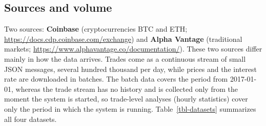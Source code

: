 \documentclass[
]{article}
\begin{document}
\subsection{Sources and volume}\label{sources-and-volume}

Two sources: \textbf{Coinbase} (cryptocurrencies BTC and ETH; \url{https://docs.cdp.coinbase.com/exchange}) and \textbf{Alpha Vantage} (traditional markets; \url{https://www.alphavantage.co/documentation/}). These two sources differ mainly in how the data arrives. Trades come as a continuous stream of small JSON messages, several hundred thousand per day, while prices and the interest rate are downloaded in batches. The batch data covers the period from 2017-01-01, whereas the trade stream has no history and is collected only from the moment the system is started, so trade-level analyses (hourly statistics) cover only the period in which the system is running. Table~\ref{tbl-datasets} summarizes all four datasets.
\end{document}
